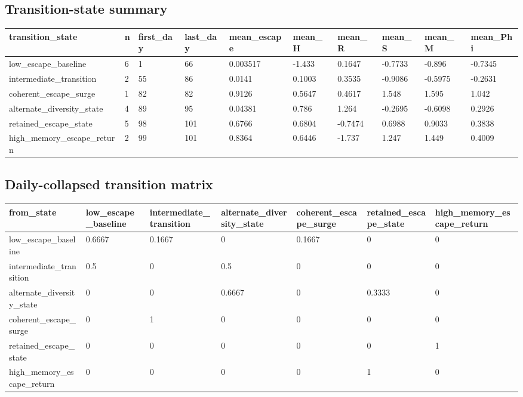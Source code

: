 \subsection*{Transition-state summary}
\begin{tabular}{llllllllll}
\toprule
transition\_state & n & first\_day & last\_day & mean\_escape & mean\_H & mean\_R & mean\_S & mean\_M & mean\_Phi \\
\midrule
low\_escape\_baseline & 6 & 1 & 66 & 0.003517 & -1.433 & 0.1647 & -0.7733 & -0.896 & -0.7345 \\
intermediate\_transition & 2 & 55 & 86 & 0.0141 & 0.1003 & 0.3535 & -0.9086 & -0.5975 & -0.2631 \\
coherent\_escape\_surge & 1 & 82 & 82 & 0.9126 & 0.5647 & 0.4617 & 1.548 & 1.595 & 1.042 \\
alternate\_diversity\_state & 4 & 89 & 95 & 0.04381 & 0.786 & 1.264 & -0.2695 & -0.6098 & 0.2926 \\
retained\_escape\_state & 5 & 98 & 101 & 0.6766 & 0.6804 & -0.7474 & 0.6988 & 0.9033 & 0.3838 \\
high\_memory\_escape\_return & 2 & 99 & 101 & 0.8364 & 0.6446 & -1.737 & 1.247 & 1.449 & 0.4009 \\
\bottomrule
\end{tabular}

\subsection*{Daily-collapsed transition matrix}
\begin{tabular}{lllllll}
\toprule
from\_state & low\_escape\_baseline & intermediate\_transition & alternate\_diversity\_state & coherent\_escape\_surge & retained\_escape\_state & high\_memory\_escape\_return \\
\midrule
low\_escape\_baseline & 0.6667 & 0.1667 & 0 & 0.1667 & 0 & 0 \\
intermediate\_transition & 0.5 & 0 & 0.5 & 0 & 0 & 0 \\
alternate\_diversity\_state & 0 & 0 & 0.6667 & 0 & 0.3333 & 0 \\
coherent\_escape\_surge & 0 & 1 & 0 & 0 & 0 & 0 \\
retained\_escape\_state & 0 & 0 & 0 & 0 & 0 & 1 \\
high\_memory\_escape\_return & 0 & 0 & 0 & 0 & 1 & 0 \\
\bottomrule
\end{tabular}

